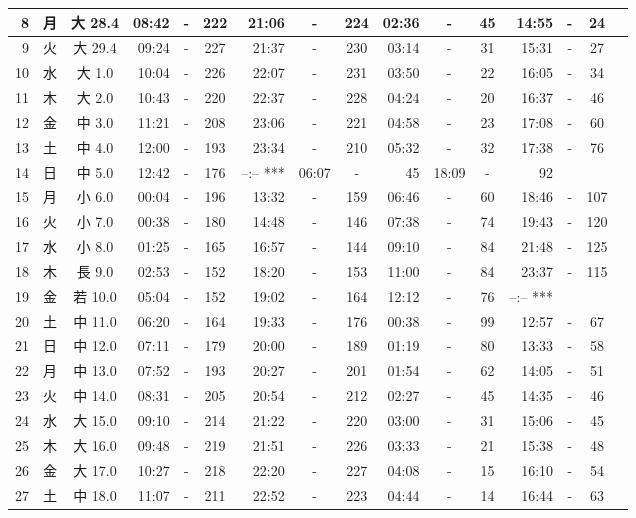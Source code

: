 \documentclass[12pt.a4j]{jsarticle}
\begin{document}
\begin{center}
\begin{table}[ht]
\begin{tabular}{|rc|cr|ccrccr|ccrccr|}
\hline
 8 & 月 & 大 28.4 & 08:42 &-& 222 & 21:06 &-& 224 & 02:36 &-&  45 & 14:55 &-&  24 \\
\hline
 9 & 火 & 大 29.4 & 09:24 &-& 227 & 21:37 &-& 230 & 03:14 &-&  31 & 15:31 &-&  27 \\
\hline
10 & 水 & 大  1.0 & 10:04 &-& 226 & 22:07 &-& 231 & 03:50 &-&  22 & 16:05 &-&  34 \\
\hline
11 & 木 & 大  2.0 & 10:43 &-& 220 & 22:37 &-& 228 & 04:24 &-&  20 & 16:37 &-&  46 \\
\hline
12 & 金 & 中  3.0 & 11:21 &-& 208 & 23:06 &-& 221 & 04:58 &-&  23 & 17:08 &-&  60 \\
\hline
13 & 土 & 中  4.0 & 12:00 &-& 193 & 23:34 &-& 210 & 05:32 &-&  32 & 17:38 &-&  76 \\
\hline
14 & 日 & 中  5.0 & 12:42 &-& 176 & --:--   *** & 06:07 &-&  45 & 18:09 &-&  92 \\
\hline
15 & 月 & 小  6.0 & 00:04 &-& 196 & 13:32 &-& 159 & 06:46 &-&  60 & 18:46 &-& 107 \\
\hline
16 & 火 & 小  7.0 & 00:38 &-& 180 & 14:48 &-& 146 & 07:38 &-&  74 & 19:43 &-& 120 \\
\hline
17 & 水 & 小  8.0 & 01:25 &-& 165 & 16:57 &-& 144 & 09:10 &-&  84 & 21:48 &-& 125 \\
\hline
18 & 木 & 長  9.0 & 02:53 &-& 152 & 18:20 &-& 153 & 11:00 &-&  84 & 23:37 &-& 115 \\
\hline
19 & 金 & 若 10.0 & 05:04 &-& 152 & 19:02 &-& 164 & 12:12 &-&  76 & --:--   *** \\
\hline
20 & 土 & 中 11.0 & 06:20 &-& 164 & 19:33 &-& 176 & 00:38 &-&  99 & 12:57 &-&  67 \\
\hline
21 & 日 & 中 12.0 & 07:11 &-& 179 & 20:00 &-& 189 & 01:19 &-&  80 & 13:33 &-&  58 \\
\hline
22 & 月 & 中 13.0 & 07:52 &-& 193 & 20:27 &-& 201 & 01:54 &-&  62 & 14:05 &-&  51 \\
\hline
23 & 火 & 中 14.0 & 08:31 &-& 205 & 20:54 &-& 212 & 02:27 &-&  45 & 14:35 &-&  46 \\
\hline
24 & 水 & 大 15.0 & 09:10 &-& 214 & 21:22 &-& 220 & 03:00 &-&  31 & 15:06 &-&  45 \\
\hline
25 & 木 & 大 16.0 & 09:48 &-& 219 & 21:51 &-& 226 & 03:33 &-&  21 & 15:38 &-&  48 \\
\hline
26 & 金 & 大 17.0 & 10:27 &-& 218 & 22:20 &-& 227 & 04:08 &-&  15 & 16:10 &-&  54 \\
\hline
27 & 土 & 中 18.0 & 11:07 &-& 211 & 22:52 &-& 223 & 04:44 &-&  14 & 16:44 &-&  63 \\

\end{tabular}
\end{table}
\end{center}
\end{document}
